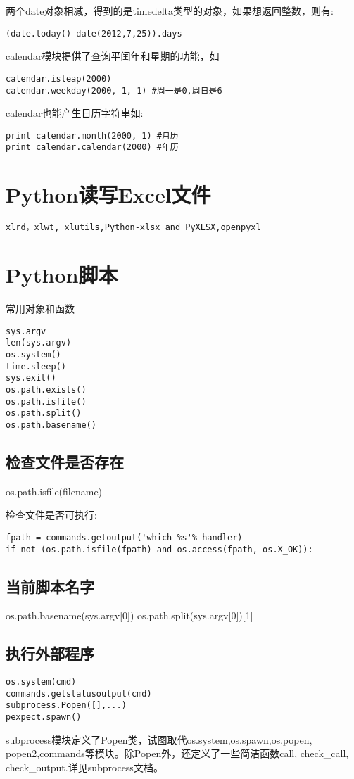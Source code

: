两个date对象相减，得到的是timedelta类型的对象，如果想返回整数，则有:
\begin{verbatim}
(date.today()-date(2012,7,25)).days
\end{verbatim}

calendar模块提供了查询平闰年和星期的功能，如
\begin{verbatim}
calendar.isleap(2000)
calendar.weekday(2000, 1, 1) #周一是0,周日是6
\end{verbatim}
calendar也能产生日历字符串如:
\begin{verbatim}
print calendar.month(2000, 1) #月历
print calendar.calendar(2000) #年历
\end{verbatim}

\label{sec:pythonTimeCalc}


\section{Python读写Excel文件}
\begin{verbatim}
xlrd，xlwt, xlutils,Python-xlsx and PyXLSX,openpyxl
\end{verbatim}

\section{Python脚本}
常用对象和函数
\begin{verbatim}
sys.argv
len(sys.argv)
os.system()
time.sleep()
sys.exit()
os.path.exists()
os.path.isfile()
os.path.split()
os.path.basename()
\end{verbatim}

\subsection{检查文件是否存在}
os.path.isfile(filename)

检查文件是否可执行:
\begin{verbatim}
fpath = commands.getoutput('which %s'% handler)
if not (os.path.isfile(fpath) and os.access(fpath, os.X_OK)):
\end{verbatim}
\subsection{当前脚本名字}
os.path.basename(sys.argv[0])
os.path.split(sys.argv[0])[1]
\subsection{执行外部程序}
\begin{verbatim}
os.system(cmd)
commands.getstatusoutput(cmd)
subprocess.Popen([],...)
pexpect.spawn()
\end{verbatim}
subprocess模块定义了Popen类，试图取代os.system,os.spawn,os.popen, popen2,commands等模块。除Popen外，还定义了一些简洁函数call, check\_call, check\_output.详见subprocess文档。

